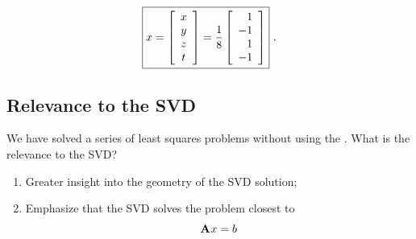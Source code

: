 \begin{equation}
\boxed{
  x = \mat{c}{x\\y\\z\\t}=\frac{1}{8}\mat{r}{1\\-1\\1\\-1}
  }\ .
\end{equation}
 
\subsection{Relevance to the SVD}
We have solved a series of least squares problems without using the \svdl. What is the relevance to the SVD?
\begin{enumerate}
\item Greater insight into the geometry of the SVD solution;
\item Emphasize that the SVD solves the problem closest to
\begin{equation}
  \A{}x = b
\end{equation}
 
\end{enumerate}



\endinput